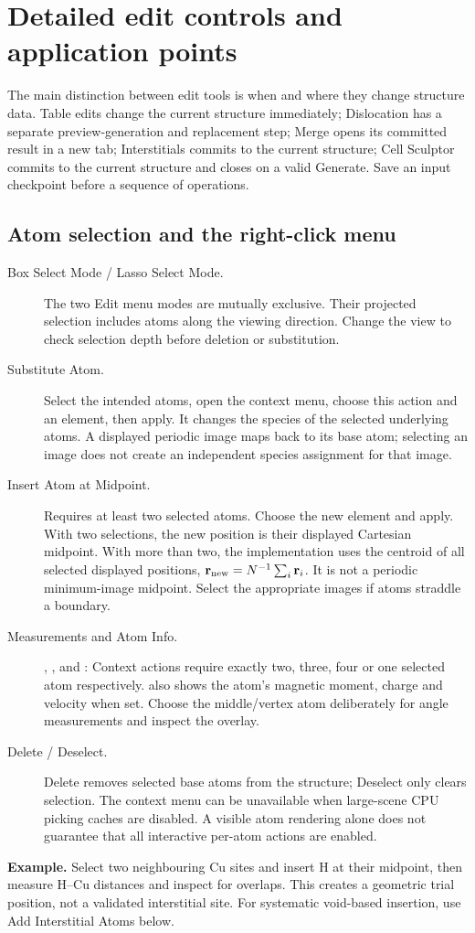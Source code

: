 \section{Detailed edit controls and application points}\label{sec:edit-controls}
The main distinction between edit tools is when and where they change structure data. Table edits change the current structure immediately; Dislocation has a separate preview-generation and replacement step; Merge opens its committed result in a new tab; Interstitials commits to the current structure; Cell Sculptor commits to the current structure and closes on a valid Generate. Save an input checkpoint before a sequence of operations.

\subsection{Atom selection and the right-click menu}
\begin{description}
\item[Box Select Mode / Lasso Select Mode.] The two Edit menu modes are mutually exclusive. Their projected selection includes atoms along the viewing direction. Change the view to check selection depth before deletion or substitution.
\item[Substitute Atom.] Select the intended atoms, open the context menu, choose this action and an element, then apply. It changes the species of the selected underlying atoms. A displayed periodic image maps back to its base atom; selecting an image does not create an independent species assignment for that image.
\item[Insert Atom at Midpoint.] Requires at least two selected atoms. Choose the new element and apply. With two selections, the new position is their displayed Cartesian midpoint. With more than two, the implementation uses the centroid of all selected displayed positions, $\mathbf r_{\rm new}=N^{-1}\sum_i\mathbf r_i$. It is not a periodic minimum-image midpoint. Select the appropriate images if atoms straddle a boundary.
\item[Measurements and Atom Info.] , ,  and : Context actions require exactly two, three, four or one selected atom respectively.  also shows the atom's magnetic moment, charge and velocity when set. Choose the middle/vertex atom deliberately for angle measurements and inspect the overlay.
\item[Delete / Deselect.] Delete removes selected base atoms from the structure; Deselect only clears selection. The context menu can be unavailable when large-scene CPU picking caches are disabled. A visible atom rendering alone does not guarantee that all interactive per-atom actions are enabled.
\end{description}
\textbf{Example.} Select two neighbouring Cu sites and insert H at their midpoint, then measure H--Cu distances and inspect for overlaps. This creates a geometric trial position, not a validated interstitial site. For systematic void-based insertion, use Add Interstitial Atoms below.

